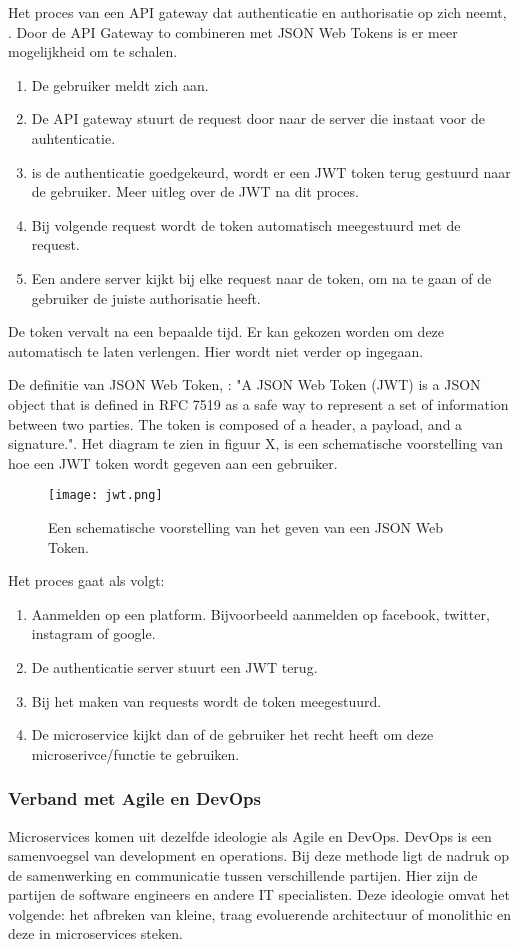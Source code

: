 Het proces van een API gateway dat authenticatie en authorisatie op zich neemt, \textcite{Siraj2017}.
Door de API Gateway to combineren met JSON Web Tokens is er meer mogelijkheid om te schalen. 
\begin{enumerate}
	\item De gebruiker meldt zich aan.
	\item De API gateway stuurt de request door naar de server die instaat voor de auhtenticatie.
	\item is de authenticatie goedgekeurd, wordt er een JWT token terug gestuurd naar de gebruiker. Meer uitleg over de JWT na dit proces.
	\item Bij volgende request wordt de token automatisch meegestuurd met de request.
	\item Een andere server kijkt bij elke request naar de token, om na te gaan of de gebruiker de juiste authorisatie heeft. 
\end{enumerate}
De token vervalt na een bepaalde tijd. Er kan gekozen worden om deze automatisch te laten verlengen. Hier wordt niet verder op ingegaan. 

De definitie van JSON Web Token, \textcite{Stecky-Efantis2016}: "A JSON Web Token (JWT) is a JSON object that is defined in RFC 7519 as a safe way to represent a set of information between two parties. The token is composed of a header, a payload, and a signature.". Het diagram te zien in figuur X, is een schematische voorstelling van hoe een JWT token wordt gegeven aan een gebruiker.
\begin{figure}[h]
	\texttt{[image: jwt.png]}
	\centering
	\caption{Een schematische voorstelling van het geven van een JSON Web Token. \textcite{Stecky-Efantis2016}}
\end{figure}
Het proces gaat als volgt:
\begin{enumerate}
	\item Aanmelden op een platform. Bijvoorbeeld aanmelden op facebook, twitter, instagram of google.
	\item De authenticatie server stuurt een JWT terug.
	\item Bij het maken van requests wordt de token meegestuurd.
	\item De microservice kijkt dan of de gebruiker het recht heeft om deze microserivce/functie te gebruiken.
\end{enumerate}


\subsubsection{Verband met Agile en DevOps}
Microservices komen uit dezelfde ideologie als Agile en DevOps. DevOps is een samenvoegsel van development en operations. Bij deze methode ligt de nadruk op de samenwerking en communicatie tussen verschillende partijen. Hier zijn de partijen de software engineers en andere IT specialisten. Deze ideologie omvat het volgende: het afbreken van kleine, traag evoluerende architectuur of monolithic en deze in microservices steken.

